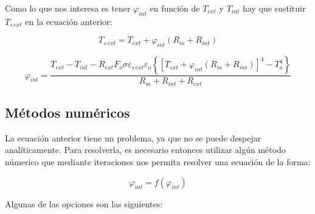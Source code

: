 \documentclass[11pt]{article}
\begin{document}
Como lo que nos interesa es tener $ \varphi _{ int } $ en función de $ T_{ ext } $ y $ T_{ int } $ hay que sustituir $ T_{ s \, ext } $ en la ecuación anterior:

\[ T_{ s \, ext } = T_{ ext } + \varphi _{ int } \left( R_m + R_{ int } \right) \]

\[ \boxed{ \varphi _{ int } = \frac{ T_{ ext} - T_{ int } - R_{ ext } F_o \sigma \varepsilon _{ s \, ext } \varepsilon _o \left\{ \left[ T_{ ext } + \varphi _{ int } \left( R_m + R_{ int } \right) \right] ^4 - T_o^4 \right\} }{ R_m + R_{ int } + R_{ ext } } } \]

\subsection*{Métodos numéricos}

La ecuación anterior tiene un problema, ya que no se puede despejar analíticamente. Para resolverla, es necesario entonces utilizar algún método númerico que mediante iteraciones nos permita resolver una ecuación de la forma:

\[ \varphi _{ int } = f \left( \varphi _{ int } \right) \]

Algunas de las opciones son las siguientes:
\end{document}
